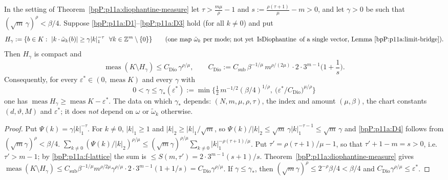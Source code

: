 \begin{corollary}\label{bpP:p11a:power-law}
In the setting of Theorem~\ref{bpP:p11a:diophantine-measure} let $\tau>\frac{m\mu}\rho-1$ and $s:=\frac{\rho(\tau+1)}\mu-m>0$, and let $\gamma>0$ be such that $(\sqrt m\,\gamma)^\rho<\beta/4$. Suppose \ref{bpP:p11a:D1}--\ref{bpP:p11a:D3} hold (for all $k\ne0$) and put
\[H_\gamma:=\{b\in K:\ \lvert k\cdot\tilde\omega_k(b)\rvert\ge\gamma\lvert k\rvert_1^{-\tau}\ \ \forall k\in\Z^m\setminus\{0\}\}\qquad(\text{one map }\tilde\omega_k\text{ per mode; not yet }\operatorname{IsDiophantine}\text{ of a single vector, Lemma~\ref{bpP:p11a:limit-bridge}}).\]
Then $H_\gamma$ is compact and
\[\operatorname{meas}(K\setminus H_\gamma)\le C_{\mathrm{Dio}}\,\gamma^{\rho/\mu},\qquad C_{\mathrm{Dio}}:=C_{\mathrm{sub}}\,\beta^{-1/\mu}\,m^{\rho/(2\mu)}\cdot2\cdot3^{m-1}\Big(1+\frac1s\Big).\]
Consequently, for every $\varepsilon^*\in(0,\operatorname{meas}K)$ and every $\gamma$ with
\[0<\gamma\le\gamma_*(\varepsilon^*):=\min\Big\{\tfrac12\,m^{-1/2}(\beta/4)^{1/\rho},\ \big(\varepsilon^*/C_{\mathrm{Dio}}\big)^{\mu/\rho}\Big\}\]
one has $\operatorname{meas}H_\gamma\ge\operatorname{meas}K-\varepsilon^*$. The data on which $\gamma_*$ depends: $(N,m,\mu,\rho,\tau)$, the index and amount $(\mu,\beta)$, the chart constants $(d,\vartheta,M)$ and $\varepsilon^*$; it does \emph{not} depend on $\omega$ or $\tilde\omega_k$ otherwise.
\end{corollary}
\begin{proof}
\label{stepP:p11a:pl-profile} Put $\Psi(k)=\gamma\lvert k\rvert_1^{-\tau}$. For $k\ne0$, $\lvert k\rvert_1\ge1$ and $\lvert k\rvert_2\ge\lvert k\rvert_1/\sqrt m$, so $\Psi(k)/\lvert k\rvert_2\le\sqrt m\,\gamma\lvert k\rvert_1^{-\tau-1}\le\sqrt m\,\gamma$ and \ref{bpP:p11a:D4} follows from $(\sqrt m\gamma)^\rho<\beta/4$.
\label{stepP:p11a:pl-sum} $\sum_{k\ne0}(\Psi(k)/\lvert k\rvert_2)^{\rho/\mu}\le(\sqrt m\gamma)^{\rho/\mu}\sum_{k\ne0}\lvert k\rvert_1^{-\rho(\tau+1)/\mu}$. Put $\tau'=\rho(\tau+1)/\mu-1$, so that $\tau'+1-m=s>0$, i.e.\ $\tau'>m-1$; by \ref{bpP:p11a:f-lattice} the sum is $\le S(m,\tau')=2\cdot3^{m-1}(s+1)/s$.
\label{stepP:p11a:pl-conc} Theorem~\ref{bpP:p11a:diophantine-measure} gives $\operatorname{meas}(K\setminus H_\gamma)\le C_{\mathrm{sub}}\beta^{-1/\mu}m^{\rho/2\mu}\gamma^{\rho/\mu}\cdot2\cdot3^{m-1}(1+1/s)=C_{\mathrm{Dio}}\gamma^{\rho/\mu}$. If $\gamma\le\gamma_*$, then $(\sqrt m\gamma)^\rho\le2^{-\rho}\beta/4<\beta/4$ and $C_{\mathrm{Dio}}\gamma^{\rho/\mu}\le\varepsilon^*$.
\end{proof}

